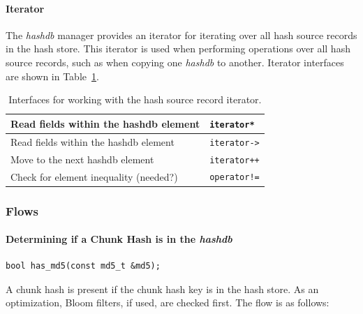 \documentclass[12pt,twoside]{article}
\newcommand{\hdb}{\emph{hashdb}\xspace}
\begin{document}
\paragraph{Iterator}
The \hdb manager provides an iterator for iterating over all hash source records in the hash store.
This iterator is used when performing operations over all hash source records,
such as when copying one \hdb to another.
Iterator interfaces are shown in Table~\ref{hashdb-manager-iterator-interfaces}.
\begin{table}[h]
\center
\begin{tabular}{|p{2in}|p{4in}|}
\hline
Read fields within the hashdb element & \texttt{iterator*} \\
\hline
Read fields within the hashdb element & \texttt{iterator->} \\
\hline
Move to the next hashdb element & \texttt{iterator++} \\
\hline
Check for element inequality (needed?) & \texttt{operator!=} \\
\hline
\end{tabular}
\caption{Interfaces for working with the hash source record iterator.\label{hashdb-manager-iterator-interfaces}}
\end{table}

\subsubsection{Flows}
\paragraph{Determining if a Chunk Hash is in the \hdb}
\begin{small}
\begin{verbatim}
bool has_md5(const md5_t &md5);
\end{verbatim}
\end{small}
A chunk hash is present if the chunk hash key is in the hash store.
As an optimization, Bloom filters, if used, are checked first.
The flow is as follows:

\begin{algorithmic}
  \RETURN \FALSE
\ENDIF
{}
  \RETURN \FALSE
\ENDIF
{}
  \RETURN \TRUE
\ELSE
  \RETURN \FALSE
\ENDIF
\end{algorithmic}
\end{document}
